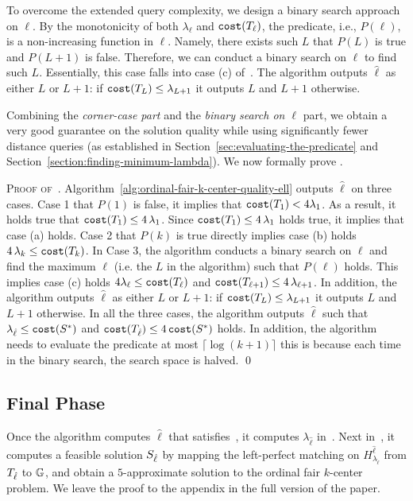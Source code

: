 To overcome the extended query complexity, we design a binary search approach on $\ell$. 
By the monotonicity of both $\lambda_{\ell}$ and $\texttt{cost}(T_{\ell})$, the predicate, i.e., $P(\ell)$, is a non-increasing function in $\ell$. 
Namely, there exists such $L$ that $P(L)$ is true and $P(L+1)$ is false. 
Therefore, we can conduct a binary search on $\ell$ to find such $L$. 
Essentially, this case falls into case (c) of~.
The algorithm outputs $\hat{\ell}$ as either $L$ or $L+1$: if $\texttt{cost}(T_{L}) \leq \lambda_{L+1}$ it outputs $L$ and $L+1$ otherwise.

\smallskip 

Combining the \emph{corner-case part} and the \emph{binary search on $\ell$} part, we obtain a very good guarantee on the solution quality while using significantly fewer distance queries (as established in Section~\ref{sec:evaluating-the-predicate} and Section~\ref{section:finding-minimum-lambda}). 
We now formally prove .




\textsc{Proof of~.}
    Algorithm~\ref{alg:ordinal-fair-k-center-quality-ell} outputs $\hat{\ell}$ on three cases. 
    Case 1 that $P(1)$ is false, it implies that $\texttt{cost}(T_{1}) < 4 \lambda_1$. 
    As a result, it holds true that $\texttt{cost}(T_{1}) \leq 4\,\lambda_{1}$. 
    Since $\texttt{cost}(T_{1}) \leq 4\,\lambda_{1}$ holds true, it implies that case (a) holds. 
    Case 2 that $P(k)$ is true directly implies case (b) holds $4\,\lambda_{k} \leq \texttt{cost}(T_{k})$.  
    In Case 3, the algorithm conducts a binary search on $\ell$ and find the maximum $\ell$ (i.e. the $L$ in the algorithm) such that $P(\ell)$ holds. This implies case (c) holds $4\lambda_{\ell} \leq \texttt{cost}(T_{\ell})$ and $\texttt{cost}(T_{\ell + 1}) \leq 4\, \lambda_{\ell +1}$.
    In addition, the algorithm outputs $\hat{\ell}$ as either $L$ or $L+1$: if $\texttt{cost}(T_{L}) \leq \lambda_{L+1}$ it outputs $L$ and $L+1$ otherwise.
    In all the three cases, the algorithm outputs $\hat{\ell}$ such that $\lambda_{\hat{\ell}} \leq \texttt{cost}(S^*)$ and $\texttt{cost}(T_{\hat{\ell}}) \leq 4\, \texttt{cost}(S^*)$ holds.
    In addition, the algorithm needs to evaluate the predicate at most $\lceil \log(k+1) \rceil$ this is because each time in the binary search, the search space is halved.
\hfill\qed


\subsection{Final Phase}\label{sec:finalphase}
Once the algorithm computes $\hat{\ell}$ that satisfies~, it computes $\lambda_{\hat{\ell}}$ in~.
Next in~, it computes a feasible solution $S_{\hat{\ell}}$ by mapping the left-perfect matching on $H^{\hat{\ell}}_{\lambda_{\hat{\ell}}}$ from $T_{\hat{\ell}}$ to $\mathbb{G}$,  and obtain a $5$-approximate solution to the ordinal fair $k$-center problem.
We leave the proof to the appendix in the full version of the paper. 
 
